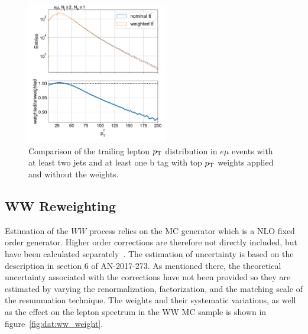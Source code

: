 \begin{figure}[ht]
    \centering
    \includegraphics[width=0.55\textwidth]{chapters/3_dataAndSimulation/figures/top_pt_weight}
    \caption{Comparison of the trailing lepton $p_{\mathrm{T}}$ distribution in $e\mu$ events with at least two jets and at least one b tag with top $p_{\mathrm{T}}$ weights applied and without the weights.}
    \label{fig:dat:top_pt_weight}
\end{figure}


\subsection{WW \pt Reweighting}
Estimation of the $WW$ process relies on the \POWHEG MC generator which is a NLO fixed order generator. Higher order corrections are therefore not directly included, but have been calculated separately~\cite{Meade:2014fca, Jaiswal:2014yba, Grazzini:2015wpa}.  The estimation of uncertainty is based on the description in section 6 of AN-2017-273. As mentioned there, the theoretical uncertainty associated with the corrections have not been provided so they are estimated by varying the renormalization, factorization, and the matching scale of the \pt resummation technique. The weights and their systematic variations, as well as the effect on the lepton \pt spectrum in the WW MC sample is shown in figure~\ref{fig:dat:ww_weight}.

